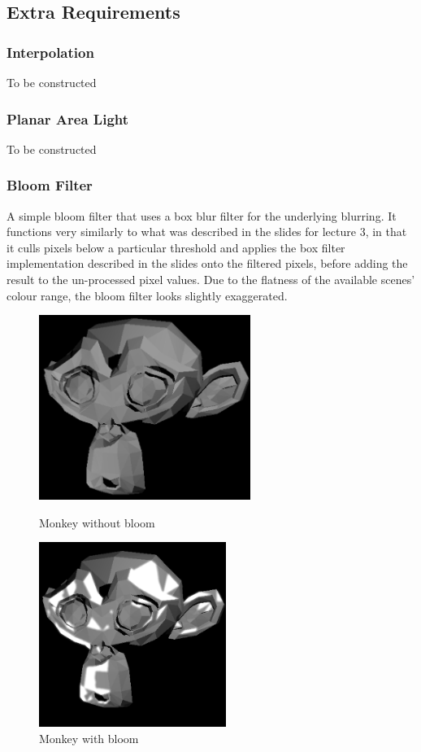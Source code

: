 \documentclass{article}
\begin{document}
    \subsection{Extra Requirements}
    \subsubsection{Interpolation}
    To be constructed

    \subsubsection{Planar Area Light}
    To be constructed

    \subsubsection{Bloom Filter}
    A simple bloom filter that uses a box blur filter for the underlying blurring. It functions very similarly 
    to what was described in the slides for lecture 3, in that it culls pixels below a particular threshold 
    and applies the box filter implementation described in the slides onto the filtered pixels, before adding 
    the result to the un-processed pixel values. Due to the flatness of the available scenes' colour range,
    the bloom filter looks slightly exaggerated.

    \begin{figure}[!htb]
          \includegraphics[width=\linewidth, height=6cm]{images/monkey_no_bloom}
          \caption*{Monkey without bloom}
        \endminipage\hfill
          \includegraphics[width=\linewidth, height=6cm]{images/monkey_bloom}
          \caption*{Monkey with bloom}
        \endminipage
    \end{figure}
    
\end{document}
